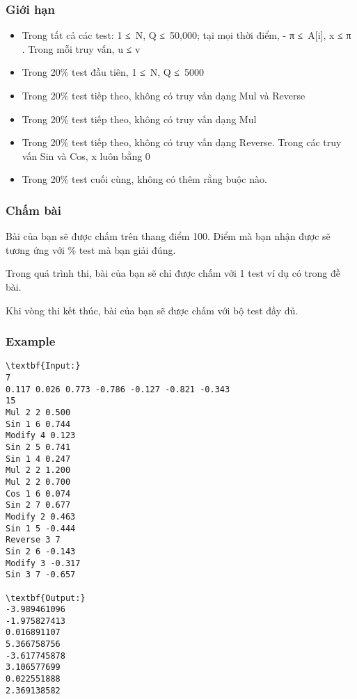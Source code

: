 \subsubsection{   Giới hạn  }
\begin{itemize}
	\item     Trong tất cả các test: 1 ≤ N, Q ≤ 50,000; tại mọi thời điểm, -         π        ≤ A[i], x ≤         π        . Trong mỗi truy vấn, u ≤ v   
	\item     Trong 20\% test đầu tiên, 1 ≤ N, Q ≤ 5000   
	\item     Trong 20\% test tiếp theo, không có truy vấn dạng Mul và Reverse   
	\item     Trong 20\% test tiếp theo, không có truy vấn dạng Mul   
	\item     Trong 20\% test tiếp theo, không có truy vấn dạng Reverse. Trong các truy vấn Sin và Cos, x luôn bằng 0   
	\item     Trong 20\% test cuối cùng, không có thêm rằng buộc nào.   
\end{itemize}

\subsubsection{   Chấm bài  }

   Bài của bạn sẽ được chấm trên thang điểm 100. Điểm mà bạn nhận được sẽ tương ứng với \% test mà bạn giải đúng.  

   Trong quá trình thi, bài của bạn sẽ chỉ được chấm với 1 test ví dụ có trong đề bài.  

   Khi vòng thi kết thúc, bài của bạn sẽ được chấm với bộ test đầy đủ.  

\subsubsection{    Example   }
\begin{verbatim}
\textbf{Input:}
7
0.117 0.026 0.773 -0.786 -0.127 -0.821 -0.343
15
Mul 2 2 0.500
Sin 1 6 0.744
Modify 4 0.123
Sin 2 5 0.741
Sin 1 4 0.247
Mul 2 2 1.200
Mul 2 2 0.700
Cos 1 6 0.074
Sin 2 7 0.677
Modify 2 0.463
Sin 1 5 -0.444
Reverse 3 7
Sin 2 6 -0.143
Modify 3 -0.317
Sin 3 7 -0.657

\textbf{Output:}
-3.989461096
-1.975827413
0.016891107
5.366758756
-3.617745878
3.106577699
0.022551888
2.369138582
\end{verbatim}